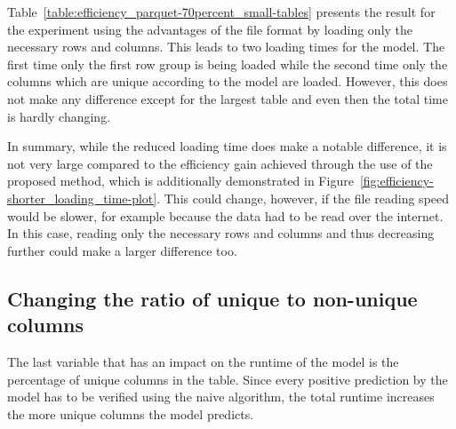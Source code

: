 Table~\ref{table:efficiency_parquet-70percent_small-tables} presents the result for the experiment using the advantages of the file format by loading only the necessary rows and columns. This leads to two loading times for the model. The first time only the first row group is being loaded while the second time only the columns which are unique according to the model are loaded. However, this does not make any difference except for the largest table and even then the total time is hardly changing.





In summary, while the reduced loading time does make a notable difference, it is not very large compared to the efficiency gain achieved through the use of the proposed method, which is additionally demonstrated in Figure~\ref{fig:efficiency-shorter_loading_time-plot}. This could change, however, if the file reading speed would be slower, for example because the data had to be read over the internet. In this case, reading only the necessary rows and columns and thus decreasing \io{} further could make a larger difference too.









\subsection{Changing the ratio of unique to non-unique columns}\label{subsec:efficiency-changing_uniques}
The last variable that has an impact on the runtime of the model is the percentage of unique columns in the table. Since every positive prediction by the model has to be verified using the naive algorithm, the total runtime increases the more unique columns the model predicts.

